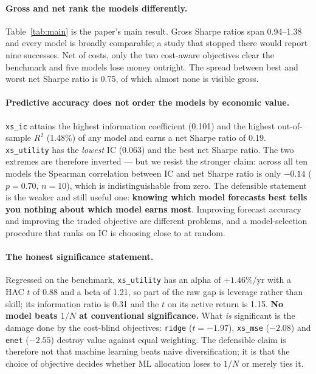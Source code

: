 \documentclass[11pt,a4paper]{article}
\begin{document}
\paragraph{Gross and net rank the models differently.} Table~\ref{tab:main} is the
paper's main result. Gross Sharpe ratios span 0.94--1.38 and every model is
broadly comparable; a study that stopped there would report nine successes. Net of
costs, only the two cost-aware objectives clear the benchmark and five models lose
money outright. The spread between best and worst net Sharpe ratio is 0.75, of
which almost none is visible gross.

\paragraph{Predictive accuracy does not order the models by economic value.}
\texttt{xs\_ic} attains the highest information coefficient (0.101) and the highest
out-of-sample $R^2$ (1.48\%) of any model and earns a net Sharpe ratio of 0.19.
\texttt{xs\_utility} has the \emph{lowest} IC (0.063) and the best net Sharpe
ratio. The two extremes are therefore inverted --- but we resist the stronger
claim: across all ten models the Spearman correlation between IC and net Sharpe
ratio is only $-0.14$ ($p=0.70$, $n=10$), which is indistinguishable from zero.
The defensible statement is the weaker and still useful one: \textbf{knowing which
model forecasts best tells you nothing about which model earns most}. Improving
forecast accuracy and improving the traded objective are different problems, and a
model-selection procedure that ranks on IC is choosing close to at random.

\paragraph{The honest significance statement.} Regressed on the benchmark,
\texttt{xs\_utility} has an alpha of $+1.46\%$/yr with a HAC $t$ of 0.88 and a beta
of 1.21, so part of the raw gap is leverage rather than skill; its information
ratio is 0.31 and the $t$ on its active return is 1.15. \textbf{No model beats
$1/N$ at conventional significance.} What \emph{is} significant is the damage done
by the cost-blind objectives: \texttt{ridge} ($t=-1.97$), \texttt{xs\_mse}
($-2.08$) and \texttt{enet} ($-2.55$) destroy value against equal weighting. The
defensible claim is therefore not that machine learning beats naive
diversification; it is that the choice of objective decides whether ML allocation
loses to $1/N$ or merely ties it.
\end{document}
